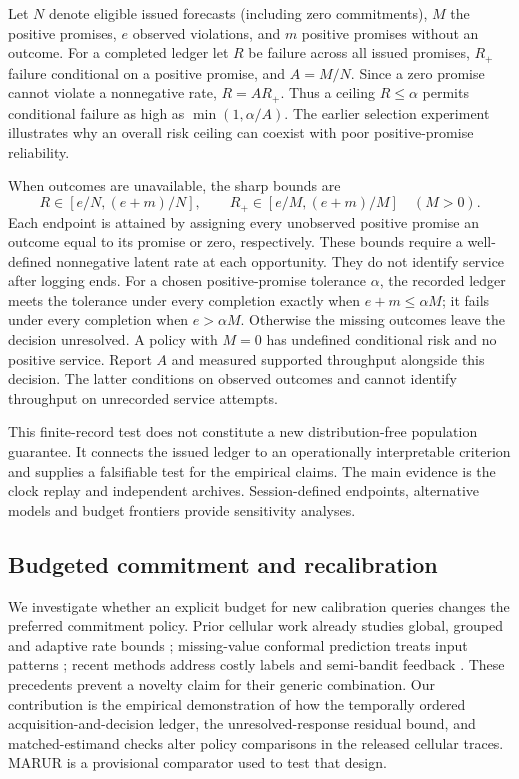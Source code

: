 \documentclass[journal,onecolumn,10pt]{IEEEtran}
\begin{document}
Let $N$ denote eligible issued forecasts (including zero commitments), $M$ the positive promises, $e$ observed violations, and $m$ positive promises without an outcome. For a completed ledger let $R$ be failure across all issued promises, $R_+$ failure conditional on a positive promise, and $A=M/N$. Since a zero promise cannot violate a nonnegative rate, $R=A R_+$. Thus a ceiling $R\leq\alpha$ permits conditional failure as high as $\min(1,\alpha/A)$. The earlier selection experiment illustrates why an overall risk ceiling can coexist with poor positive-promise reliability.

When outcomes are unavailable, the sharp bounds are
\[
 R\in[e/N,(e+m)/N],\qquad
 R_+\in[e/M,(e+m)/M]\quad(M>0).
\]
Each endpoint is attained by assigning every unobserved positive promise an outcome equal to its promise or zero, respectively. These bounds require a well-defined nonnegative latent rate at each opportunity. They do not identify service after logging ends. For a chosen positive-promise tolerance $\alpha$, the recorded ledger meets the tolerance under every completion exactly when $e+m\leq\alpha M$; it fails under every completion when $e>\alpha M$. Otherwise the missing outcomes leave the decision unresolved. A policy with $M=0$ has undefined conditional risk and no positive service. Report $A$ and measured supported throughput alongside this decision. The latter conditions on observed outcomes and cannot identify throughput on unrecorded service attempts.

This finite-record test does not constitute a new distribution-free population guarantee. It connects the issued ledger to an operationally interpretable criterion and supplies a falsifiable test for the empirical claims. The main evidence is the clock replay and independent archives. Session-defined endpoints, alternative models and budget frontiers provide sensitivity analyses.
\subsection{Budgeted commitment and recalibration}
We investigate whether an explicit budget for new calibration queries changes the preferred commitment policy. Prior cellular work already studies global, grouped and adaptive rate bounds \cite{sirhan2026}; missing-value conformal prediction treats input patterns \cite{zaffran2023}; recent methods address costly labels and semi-bandit feedback \cite{ilyas2026,ge2025}. These precedents prevent a novelty claim for their generic combination. Our contribution is the empirical demonstration of how the temporally ordered acquisition-and-decision ledger, the unresolved-response residual bound, and matched-estimand checks alter policy comparisons in the released cellular traces. MARUR is a provisional comparator used to test that design.
\end{document}
